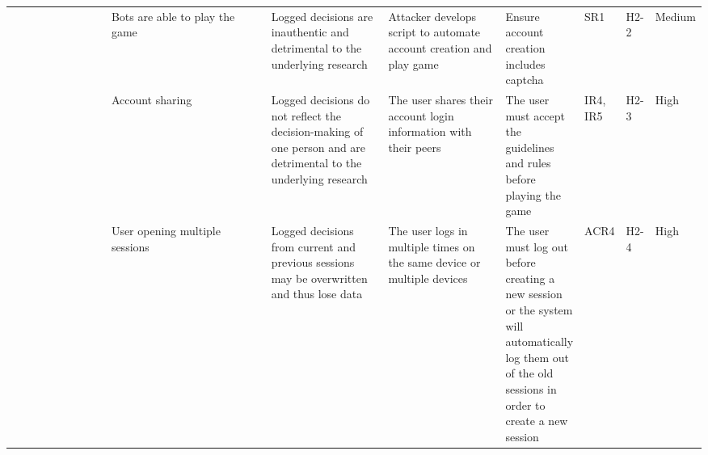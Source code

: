 \documentclass{article}
\begin{document}
\begin{table}[H]
\begin{adjustbox}{width=\textwidth}
\begin{tabular}{|p{0.20\linewidth} | p{0.30\linewidth} | p{0.20\linewidth}|  p{0.20\linewidth}|  p{0.30\linewidth}|  p{0.07\linewidth}|  p{0.07\linewidth}|p{0.12\linewidth}| }
         & Bots are able to play the game & Logged decisions are inauthentic and detrimental to the underlying research\newline & Attacker develops script to automate account creation and play game &  Ensure account creation includes captcha & SR1 & H2-2 & Medium\\
         & Account sharing & Logged decisions do not reflect the decision-making of one person and are detrimental to the underlying research\newline & The user shares their account login information with their peers & The user must accept the guidelines and rules before playing the game & IR4, IR5 & H2-3 & High\\
         
           & User opening multiple sessions & Logged decisions from current and previous sessions may be overwritten and thus lose data & The user logs in multiple times on the same device or multiple devices & The user must log out before creating a new session or the system will automatically log them out of the old sessions in order to create a new session & ACR4 & H2-4 & High\\
         \hline
    \end{tabular}
    \end{adjustbox}
    \label{tab:my_label}
\end{table}
\end{document}
